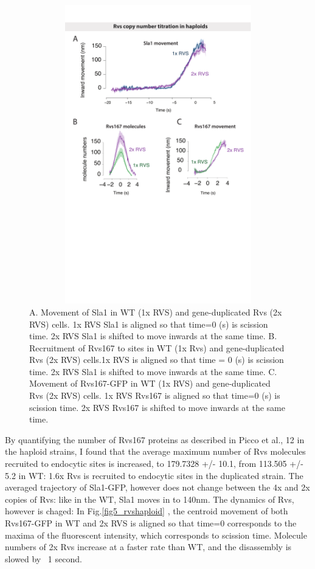 				\vspace{5mm}
				\begin{figure}[h]
				\centering
				\includegraphics[width=13cm,height=13cm,keepaspectratio]{figures/results_final/rvs_haploid}
				\caption[Overexpression of the Rvs complex in haploid cells]
					{A. Movement of Sla1 in WT (1x RVS) and gene-duplicated Rvs (2x RVS) cells. 1x RVS Sla1 is aligned so that time=0 (s) is scission time. 2x RVS Sla1 is shifted to move inwards at the same time.
					B. Recruitment of Rvs167 to sites in WT (1x Rvs)  and gene-duplicated Rvs (2x RVS) cells.1x RVS is aligned so that time = 0 (s) is scission time. 2x RVS Sla1 is shifted to move inwards at the same time.
					C.  Movement of Rvs167-GFP in WT (1x RVS) and gene-duplicated Rvs (2x RVS) cells. 1x RVS Rvs167 is aligned so that time=0 (s) is scission time. 2x RVS Rvs167 is shifted to move inwards at the same time.
			 \label{fig_rvshaploid}}

				\end{figure}
		
		By quantifying the number of Rvs167 proteins as described in Picco et al., 12  in the haploid strains, I found that the average maximum number of Rvs molecules recruited to endocytic sites is increased, to 179.7328 +/- 10.1, from 113.505 +/- 5.2 in WT:  1.6x Rvs is recruited to endocytic sites in the duplicated strain. The averaged trajectory of Sla1-GFP, however does not change between the 4x and 2x copies of Rvs: like in the WT, Sla1 moves in to 140nm. The dynamics of Rvs, however is chaged: In Fig.\ref{fig5_rvshaploid} , the centroid movement of both Rvs167-GFP in WT and 2x RVS is aligned so that time=0 corresponds to the maxima of the fluorescent intensity, which corresponds to scission time. Molecule numbers of 2x Rvs increase at a faster rate than WT, and the disassembly is slowed by ~1 second. 
		
